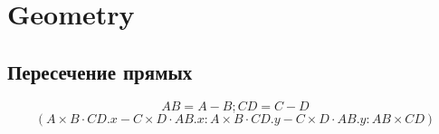 \section{Geometry}

\subsection{Пересечение прямых}

\begin{equation*}
    AB = A - B; CD = C - D
\end{equation*}
\begin{equation*}
    (A \times B \cdot CD.x - C \times D \cdot AB.x : A \times B \cdot CD.y - C \times D \cdot AB.y : AB \times CD)
\end{equation*}
